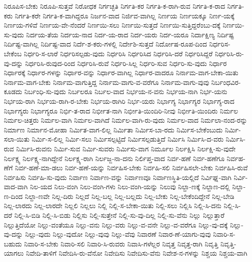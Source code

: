 {ನಿರೂಪಿಸ-ಬೇಕು
ನಿರೂಪಿ-ಸುತ್ತವೆ
ನಿರೋಧಕ
ನಿರ್ಗಚ್ಛತಿ
ನಿರ್ಗತಿ-ಕರ
ನಿರ್ಗತಿ-ಕ-ರಾಗಿ-ರುವ
ನಿರ್ಗತಿ-ಕ-ರಾದ
ನಿರ್ಗತಿ-ಕರು
ನಿರ್ಗತಿ-ಕರೇ
ನಿರ್ಗತಿ-ಕ-ವಾಗಿದ್ದರೂ
ನಿರ್ಜನ-ವಾದ
ನಿರ್ಜಿವ-ವಾಗಿಲ್ಲ
ನಿರ್ಣಯ
ನಿರ್ಣಯಕ್ಕೂ
ನಿರ್ಣ-ಯಕ್ಕೆ
ನಿರ್ಣಯ-ಗಳಿವೆ
ನಿರ್ಣಯ-ವೇ-ನೆಂದರೆ
ನಿರ್ಣಯಿ-ಸಲು
ನಿರ್ಣಯಿ-ಸುತ್ತದೆ
ನಿರ್ಣಯಿ-ಸುತ್ತಿದ್ದರೆಂಬು-ದಕ್ಕೆ
ನಿರ್ಣಯಿ-ಸು-ವುದು
ನಿರ್ದಯ-ತೆಯ
ನಿರ್ದಯ-ನಾದ
ನಿರ್ದ-ಯ-ರಾದ
ನಿರ್ದ-ಯರು
ನಿರ್ದ-ಯರೂ
ನಿರ್ದಾಕ್ಷಿಣ್ಯ
ನಿರ್ದಿಷ್ಟ
ನಿರ್ದಿಷ್ಟ-ವಾಗಿಲ್ಲ
ನಿರ್ದಿಷ್ಟ-ವಾದ
ನಿರ್ದೆ-ಶ-ಕರು-ಗಳಲ್ಲಿ
ನಿರ್ದೇಶಿ-ಸುತ್ತದೆ
ನಿರ್ದೋಷ-ರೂಪ-ದಿಂದ
ನಿರ್ಧರಿಸ-ಬೇಕೆಂಬ
ನಿರ್ಧರಿ-ಸ-ಲಾರೆ
ನಿರ್ಧರಿಸಲ್ಪಡು-ವುದು
ನಿರ್ಧರಿಸಿ
ನಿರ್ಧರಿಸಿದ
ನಿರ್ಧರಿಸಿ-ದರೆ
ನಿರ್ಧರಿಸಿದ್ದರೆ
ನಿರ್ಧರಿಸಿ-ರು-ವು-ದನ್ನು
ನಿರ್ಧರಿಸಿ-ರುವುದ-ರಿಂದ
ನಿರ್ಧರಿಸಿ-ರುವೆ
ನಿರ್ಧರಿ-ಸಿಲ್ಲ
ನಿರ್ಧರಿ-ಸುವ
ನಿರ್ಧರಿ-ಸು-ವುದು
ನಿರ್ಧಾರ
ನಿರ್ಧಾರಕ್ಕೆ
ನಿರ್ಧಾರ-ಗಳನ್ನು
ನಿರ್ಧಾರ-ವನ್ನು
ನಿರ್ಧಾರ-ವಾಗಿಲ್ಲ
ನಿರ್ಧಾರ-ವಾದರೂ
ನಿರ್ನಾಮ-ವಾಗ-ಬೇಕಾ-ಯಿತು
ನಿರ್ನಾಮ-ವಾಗ-ಬೇಕು
ನಿರ್ನಾಮ-ವಾಗುತ್ತಿದ್ದ
ನಿರ್ನಾಮ-ವಾಗು-ವ-ವರೆಗೂ
ನಿರ್ನಾಮ-ವಾಗು-ವುವು
ನಿರ್ಬಂಧವಿರ-ಕೂಡದು
ನಿರ್ಬಂಧಿ-ಸು-ವುದು
ನಿರ್ಬಲರೂ
ನಿರ್ಬಲ-ವಾದ
ನಿರ್ಭಯ-ನ-ವನು
ನಿರ್ಭಯ-ನಾಗಿ
ನಿರ್ಭ-ಯನು
ನಿರ್ಭಯ-ರಾಗಿ
ನಿರ್ಭಯ-ರಾಗಿ-ರ-ಬೇಕು
ನಿರ್ಭಯ-ರಾಗಿರಿ
ನಿರ್ಭ-ಯರು
ನಿರ್ಭಾಗ್ಯ
ನಿರ್ಭಾಗ್ಯರ
ನಿರ್ಭಾಗ್ಯ-ರಾದ
ನಿರ್ಭಾಗ್ಯರು
ನಿರ್ಭಾಗ್ಯರೂ
ನಿರ್ಭಿ-ತ-ರಾದ
ನಿರ್ಭೀತ-ನಾಗಿ
ನಿರ್ಭೀತಿ-ಯಿಂದಿರಿ-ನೀವು
ನಿರ್ಭೀತಿ-ಯಿಂದಿರು
ನಿರ್ಮಲ
ನಿರ್ಮಲ-ಚಿತ್ತರು
ನಿರ್ಮಲ-ವಾಗಿ
ನಿರ್ಮಲ-ವಾಗಿದೆ
ನಿರ್ಮಲ-ವಾಗಿ-ರು-ವುದು
ನಿರ್ಮಲ-ವಾದ
ನಿರ್ಮಲಾ-ನಂದ-ರನ್ನು
ನಿರ್ಮಾಣ
ನಿರ್ಮಾನ-ಮೋಹಾ
ನಿರ್ಮಿತ-ವಾಗ-ಲಿಲ್ಲ
ನಿರ್ಮಿತಾ
ನಿರ್ಮಿಸ-ಬಾ-ರದು
ನಿರ್ಮಿಸ-ಬೇಕೆಂಬುದು
ನಿರ್ಮಿ-ಸಲಾ-ಯಿತು
ನಿರ್ಮಿ-ಸ-ಲಿಲ್ಲ
ನಿರ್ಮಿ-ಸಲು
ನಿರ್ಮಿಸಲ್ಪಟ್ಟಿದೆ
ನಿರ್ಮಿಸಲ್ಪಡುತ್ತಿದೆ
ನಿರ್ಮಿಸಿ
ನಿರ್ಮಿಸಿ-ದ-ವರು
ನಿರ್ಮಿಸಿ-ರುವ
ನಿರ್ಮಿಸಿ-ರುವನು
ನಿರ್ಮಿ-ಸುವ
ನಿರ್ಮಿ-ಸುವರು
ನಿರ್ಮಿಸು-ವಾಗ
ನಿರ್ಮೂಲ
ನಿರ್ಲಕ್ಷಿಸಿ
ನಿರ್ಲಕ್ಷಿ-ಸು-ವುದೇ
ನಿರ್ಲಕ್ಷ್ಯ
ನಿರ್ಲಕ್ಷ್ಯ-ನಾಗಿದ್ದೇನೆ
ನಿರ್ಲಕ್ಷ್ಯ-ರಾಗಿ
ನಿರ್ಲಜ್ಜ-ನಾ-ದನು
ನಿರ್ಲಿಪ್ತ-ವಾದ
ನಿರ್ವ-ಹಣೆ
ನಿರ್ವ-ಹಣೆಗೂ
ನಿರ್ವಹ-ಣೆಗೆ
ನಿರ್ವ-ಹಣೆ-ಮಾ-ಡಲು
ನಿರ್ವ-ಹಣೆ-ಯನ್ನು
ನಿರ್ವಹಿಸ-ಬೇಕು
ನಿರ್ವಹಿ-ಸಲಿ
ನಿರ್ವಹಿಸಲೇ-ಬೇಕು
ನಿರ್ವಹಿಸಿ-ರುವೆ
ನಿರ್ವಹಿಸು
ನಿರ್ವಹಿ-ಸು-ವುದು
ನಿರ್ವಾಣ
ನಿರ್ವಾಣ-ವನ್ನು
ನಿರ್ವಾಣವೂ
ನಿರ್ವಾಣಸ್ಥಿತಿ-ಯಲ್ಲಿದೆ
ನಿರ್ವಿಘ್ನ-ವಾಗಿ
ನಿರ್ವಿ-ವಾದ-ವಾಗಿ
ನಿಲ-ಯದ
ನಿಲು-ವಂಗಿ
ನಿಲು-ವಂಗಿ-ಗಳು
ನಿಲು-ವಂಗಿ-ಯನ್ನು
ನಿಲುವು
ನಿಲ್ದಾ-ಣಕ್ಕೆ
ನಿಲ್ದಾಣ-ದಲ್ಲಿ
ನಿಲ್ದಾ-ಣ-ದಿಂದ
ನಿಲ್ದಾ-ಣವೇ
ನಿಲ್ಲ-ದಿರು
ನಿಲ್ಲದೆ
ನಿಲ್ಲ-ಬಲ್ಲ
ನಿಲ್ಲ-ಬಲ್ಲದು
ನಿಲ್ಲ-ಬೇಕು
ನಿಲ್ಲ-ಬೇಕೆಂದಿದ್ದೇನೆ
ನಿಲ್ಲ-ಬೇಡಿ
ನಿಲ್ಲ-ಲಾರದು
ನಿಲ್ಲ-ಲಾರದೇ
ನಿಲ್ಲಲಿ
ನಿಲ್ಲಲು
ನಿಲ್ಲಿ
ನಿಲ್ಲಿ-ಸ-ಬೇಕಾ-ಯಿತು
ನಿಲ್ಲಿ-ಸಲು
ನಿಲ್ಲಿಸಿ
ನಿಲ್ಲಿ-ಸಿ-ದನು
ನಿಲ್ಲಿ-ಸಿ-ದರೆ
ನಿಲ್ಲಿ-ಸಿ-ಬಿಡಿ
ನಿಲ್ಲಿ-ಸಿ-ಬಿಡು
ನಿಲ್ಲಿಸು
ನಿಲ್ಲಿ-ಸುತ್ತೇನೆ
ನಿಲ್ಲಿ-ಸು-ವು-ದಿಲ್ಲ
ನಿಲ್ಲಿ-ಸು-ವೆನು
ನಿಲ್ಲು
ನಿಲ್ಲುತ್ತಾರೆ
ನಿಲ್ಲುತ್ತಿದೆಯೋ
ನಿಲ್ಲು-ವಂತೆಯೂ
ನಿಲ್ಲು-ವನು
ನಿಲ್ಲು-ವರು
ನಿಲ್ಲು-ವ-ವನೇ
ನಿಲ್ಲು-ವ-ವರೆಗೂ
ನಿಲ್ಲು-ವು-ದಕ್ಕೆ
ನಿಲ್ಲು-ವು-ದನ್ನು
ನಿಲ್ಲು-ವುದು
ನಿಲ್ಲು-ವುದೋ
ನಿಲ್ಲು-ವುವು
ನಿಲ್ಲು-ವೆವು
ನಿವಾರಣೆ
ನಿವಾರ-ಣೆ-ಯಾಗು-ವುವು
ನಿವಾರಿ-ಸ-ಬಹುದು
ನಿವಾರಿ-ಸ-ಬೇಕು
ನಿವಾರಿ-ಸಲಿ
ನಿವಾರಿ-ಸಿ-ರುವರು
ನಿವಾಸಿ-ಗಳೆಲ್ಲರ
ನಿವೃತ್ತ
ನಿವೃತ್ತ-ರಾಗಿ
ನಿವೃತ್ತಿ
ನಿವೃತ್ತಿ-ಯಾಗಲು
ನಿವೇದಿ-ತಾಳಿಗೆ
ನಿವೇದಿಸಿ-ರು-ವೆನೋ
ನಿವೇದಿಸು
ನಿವೇದಿಸು-ವೆನು
ನಿವೇಶ-ನ-ಗಳನ್ನು
ನಿಶ್ಚಯ
ನಿಶ್ಚಯ-ವಾಗಿ
}
